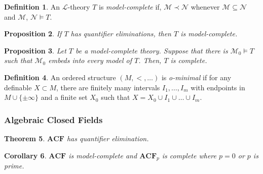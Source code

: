 \documentclass{amsart}
\newtheorem{theorem}{Theorem}[subsection]
\newtheorem{lemma}[theorem]{Lemma}
\newtheorem{proposition}[theorem]{Proposition}
\newtheorem{corollary}[theorem]{Corollary}
\theoremstyle{definition}
\newtheorem{definition}[theorem]{Definition}
\numberwithin{equation}{section}
\begin{document}
\begin{definition}
  An $\mathcal{L}$-theory $T$ is \emph{model-complete} if,
  $\mathcal{M} \prec \mathcal{N}$ whenever
  $\mathcal{M} \subseteq \mathcal{N}$  and $\mathcal{M}$, $\mathcal{N} \models T$.
\end{definition}

\begin{proposition}
  If $T$ has quantifier eliminations,
  then $T$ is model-complete.
\end{proposition}

\begin{proposition}
  Let $T$ be a model-complete theory.
  Suppose that there is $\mathcal{M}_0 \models T$ such that $\mathcal{M}_0$ embeds into every model of $T$.
  Then, $T$ is complete.
\end{proposition}

\begin{definition}
  An ordered structure $(M,<,\dots)$ is \emph{o-minimal} if
  for any definable $X \subset M$,
  there are finitely many intervals $I_1,\dots,I_m$ with endpoints in $M \cup \{\pm\infty\}$
  and a finite set $X_0$ such that $X = X_0 \cup I_1 \cup \dots \cup I_m$.
\end{definition}

\subsubsection{Algebraic Closed Fields}


\begin{theorem}
  $\mathbf{ACF}$ has quantifier elimination.
\end{theorem}

\begin{corollary}
  $\mathbf{ACF}$ is model-complete and $\mathbf{ACF}_p$ is complete where $p = 0$ or $p$ is prime.
\end{corollary}


\end{document}
